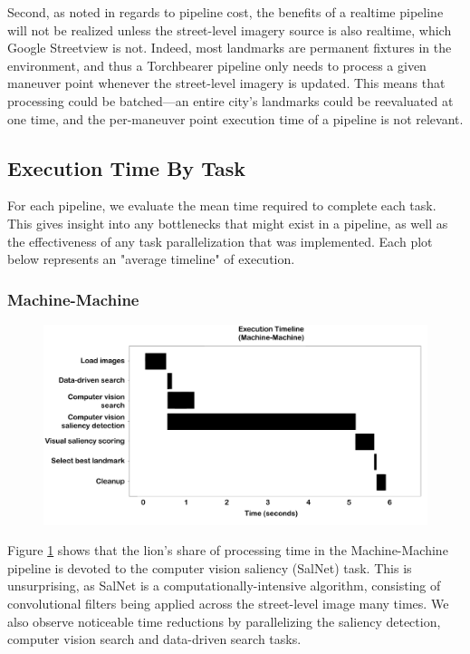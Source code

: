 Second, as noted in regards to pipeline cost, the benefits of a realtime pipeline will not be realized unless the street-level imagery source is also realtime, which Google Streetview is not. Indeed, most landmarks are permanent fixtures in the environment, and thus a Torchbearer pipeline only needs to process a given maneuver point whenever the street-level imagery is updated. This means that processing could be batched---an entire city's landmarks could be reevaluated at one time, and the per-maneuver point execution time of a pipeline is not relevant.

\subsection{Execution Time By Task}

For each pipeline, we evaluate the mean time required to complete each task. This gives insight into any bottlenecks that might exist in a pipeline, as well as the effectiveness of any task parallelization that was implemented. Each plot below represents an "average timeline" of execution.

\subsubsection{Machine-Machine}
\begin{figure}[htbp]
  \centering
  \includegraphics[width=\textwidth]{images/timeline_mm.pdf}
  \caption{}
  \label{fig:plot:timeline:mm}
\end{figure}

Figure \ref{fig:plot:timeline:mm} shows that the lion's share of processing time in the Machine-Machine pipeline is devoted to the computer vision saliency (SalNet) task. This is unsurprising, as SalNet is a computationally-intensive algorithm, consisting of convolutional filters being applied across the street-level image many times. We also observe noticeable time reductions by parallelizing the saliency detection, computer vision search and data-driven search tasks.

